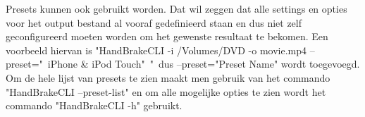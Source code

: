 Presets kunnen ook gebruikt worden. Dat wil zeggen dat alle settings en opties voor het output bestand al vooraf gedefinieerd staan en dus niet zelf geconfigureerd moeten worden om het gewenste resultaat te bekomen. Een voorbeeld hiervan is "HandBrakeCLI -i /Volumes/DVD -o movie.mp4 --preset="\ iPhone \& iPod Touch"\ "\ dus --preset="Preset Name" wordt toegevoegd.\\

Om de hele lijst van presets te zien maakt men gebruik van het commando "HandBrakeCLI --preset-list" en om alle mogelijke opties te zien wordt het commando "HandBrakeCLI -h" gebruikt.
\newpage
